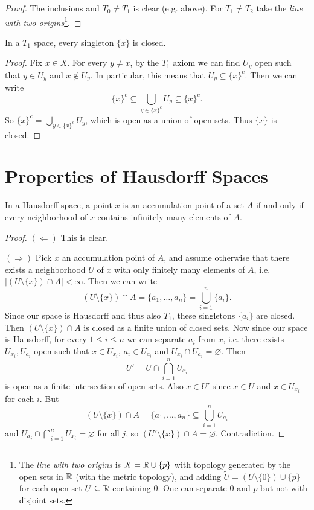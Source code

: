 \begin{proof}
  The inclusions and $T_0 \ne T_1$ is clear (e.g. above). For
  $T_1 \ne T_2$ take the \emph{line with two origins}\footnote{The \emph{line with two origins} is $X = \mathbb{R} \cup \{p\}$ with topology generated by the open sets in $\mathbb{R}$ (with the metric topology), and adding $\widetilde{U} = (U \setminus \{0\}) \cup \{p\}$ for each open set $U \subseteq \mathbb{R}$ containing $0$. One can separate $0$ and $p$ but not with disjoint sets.}.
\end{proof}

\begin{theorem}
  In a $T_1$ space, every singleton $\{x\}$ is
  closed.
\end{theorem}

\begin{proof}
  Fix $x \in X$. For every $y \ne x$, by the
  $T_1$ axiom we can find $U_y$ open such that
  $y \in U_y$ and $x \notin U_y$. In particular,
  this means that $U_y \subseteq \{x\}^c$. Then
  we can write
  \[
    \{x\}^c \subseteq \bigcup_{y \in \{x\}^c} U_y
    \subseteq \{x\}^c.
  \]
  So $\{x\}^c = \bigcup_{y \in \{x\}^c} U_y$,
  which is open as a union of open sets.
  Thus $\{x\}$ is closed.
\end{proof}

\section{Properties of Hausdorff Spaces}
\begin{theorem}
  In a Hausdorff space, a point
  $x$ is an accumulation point of
  a set $A$ if and only if every neighborhood
  of $x$ contains infinitely many elements of $A$.
\end{theorem}

\begin{proof}
  $(\Leftarrow)$ This is clear.

  $(\Rightarrow)$ Pick $x$ an accumulation point
  of $A$, and assume otherwise that there exists a
  neighborhood $U$ of $x$ with only finitely
  many elements of $A$, i.e.
  $|(U \setminus \{x\}) \cap A| < \infty$. Then
  we can write
  \[
    (U \setminus \{x\}) \cap A = \{a_1, \ldots, a_n\}
    = \bigcup_{i = 1}^n \{a_i\}.
  \]
  Since our space is Hausdorff and thus also $T_1$,
  these singletons $\{a_i\}$ are closed. Then
  $(U \setminus \{x\}) \cap A$ is closed as a
  finite union of closed sets. Now since
  our space is Hausdorff, for every
  $1 \le i \le n$ we can separate $a_i$ from $x$,
  i.e. there exists $U_{x_i}, U_{a_i}$ open
  such that $x \in U_{x_i}$, $a_i \in U_{a_i}$
  and $U_{x_i} \cap U_{a_i} = \varnothing$. Then
  \[
    U' = U \cap \bigcap_{i = 1}^n U_{x_i}
  \]
  is open as a finite intersection of open sets.
  Also $x \in U'$ since $x \in U$ and
  $x \in U_{x_i}$ for each $i$. But
  \[
    (U \setminus\{x\}) \cap A
    = \{a_1, \dots, a_n\}
    \subseteq \bigcup_{i = 1}^n U_{a_i}
  \]
  and $U_{a_j} \cap \bigcap_{i = 1}^n U_{x_i} = \varnothing$
  for all $j$, so
  $(U' \setminus \{x\}) \cap A = \varnothing$.
  Contradiction.
\end{proof}

